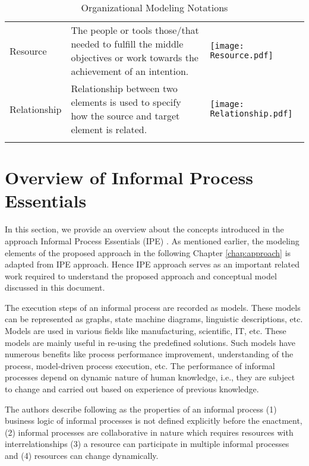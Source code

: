 \begin{center}
\begin{longtable}{p{3cm}p{10cm}p{3cm}}
		Resource					& The people or tools those/that needed to fulfill the middle objectives or work towards the achievement of an intention. & \begin{center} \texttt{[image: Resource.pdf]} \end{center}  \\
		
		Relationship				& Relationship between two elements is used to specify how the source and target element is related.  & \begin{center} \texttt{[image: Relationship.pdf]} \end{center}   \\
		
		\bottomrule
		\caption{Organizational Modeling Notations}
		\label{tab:notations}		
	\end{longtable}	
\end{center}

\section{Overview of Informal Process Essentials}
\label{sec:basicconcepts}
In this section, we provide an overview about the concepts introduced in the approach Informal Process Essentials (IPE) \cite{Sungur2014a}. As mentioned earlier, the modeling elements of the proposed approach in the following Chapter \ref{chap:approach} is adapted from IPE approach. Hence IPE approach serves as an important related work required to understand the proposed approach and conceptual model discussed in this document. 

The execution steps of an informal process are recorded as models. These models can be represented as graphs, state machine diagrams, linguistic descriptions, etc. Models are used in various fields like manufacturing, scientific, IT, etc. These models are mainly useful in re-using the predefined solutions. Such models have numerous benefits \cite{Indulska2009} like process performance improvement, understanding of the process, model-driven process execution, etc. The performance of informal processes depend on dynamic nature of human knowledge, i.e., they are subject to change and carried out based on experience of previous knowledge. 

The authors describe following as the properties of an informal process (1) business logic of informal processes is not defined explicitly before the enactment, (2) informal processes are collaborative in nature which requires resources with interrelationships (3) a resource can participate in multiple informal processes and (4) resources can change dynamically.

